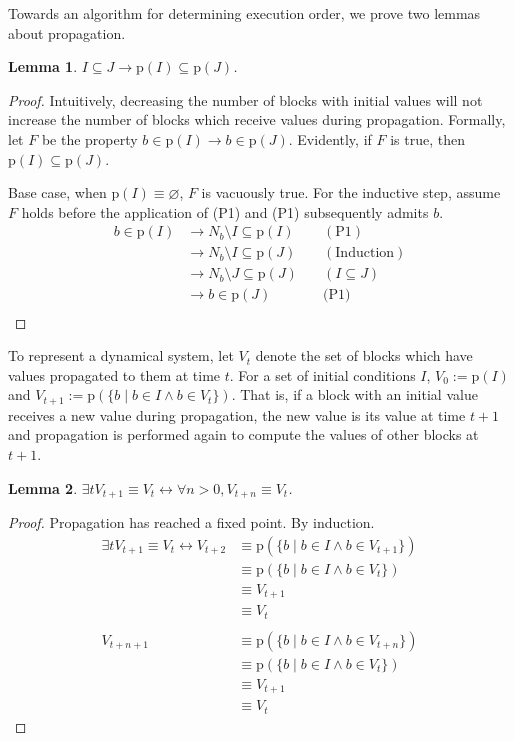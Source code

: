 \documentclass[twocolumn]{article}
\newtheorem{lemma}{Lemma}
\newcommand*{\Inputs}[1]{N_{#1}}
\begin{document}
Towards an algorithm for determining execution order, we prove two lemmas about propagation.

\begin{lemma}\label{lem:subset}
$I\subseteq J \rightarrow \text{p}(I)\subseteq\text{p}(J)$.
\end{lemma}
\begin{proof}
    Intuitively, decreasing the number of blocks with initial values will not increase the number of blocks which receive values during propagation. Formally, let $F$ be the property $b\in \text{p}(I)\rightarrow b\in\text{p}(J)$. Evidently, if $F$ is true, then $\text{p}(I)\subseteq\text{p}(J)$.

    Base case, when $\text{p}(I)\equiv\varnothing$, $F$ is vacuously true. For the inductive step, assume $F$ holds before the application of (P1) and (P1) subsequently admits $b$.
\begin{align*}
    b \in \text{p}(I) &\rightarrow \Inputs{b} \setminus I \subseteq \text{p}(I)\quad &(\text{P1})\\
    &\rightarrow \Inputs{b} \setminus I \subseteq \text{p}(J) \quad &(\text{Induction}) \\
    &\rightarrow \Inputs{b} \setminus J \subseteq \text{p}(J) \quad &(I \subseteq J) \\
    &\rightarrow b\in\text{p}(J)\quad &\text{(P1)} \\
\end{align*}
\end{proof}

To represent a dynamical system, let $V_t$ denote the set of blocks which have values propagated to them at time $t$. For a set of initial conditions $I$, $V_0 := \text{p}(I)$ and $V_{t+1} := \text{p}(\{b\mid b\in I \land b\in V_t\})$. That is, if a block with an initial value receives a new value during propagation, the new value is its value at time $t+1$ and propagation is performed again to compute the values of other blocks at $t+1$.

\begin{lemma}\label{lem:fixedpoint}
    $\exists t V_{t+1}\equiv V_t \leftrightarrow \forall n>0, V_{t+n}\equiv V_t$.
\end{lemma}
\begin{proof} Propagation has reached a fixed point. By induction.
    \[
       \begin{aligned}
           \exists t V_{t+1}\equiv V_t \leftrightarrow V_{t+2} &\equiv \text{p}(\{b\mid b\in I \land b\in V_{t+1}\}) \\
           &\equiv \text{p}(\{b\mid b\in I \land b\in V_{t}\}) \\
           &\equiv V_{t+1} \\
           &\equiv V_{t} \\ \\
           V_{t+n+1} &\equiv \text{p}(\{b\mid b\in I \land b\in V_{t+n}\}) \\
           &\equiv \text{p}(\{b\mid b\in I \land b\in V_{t}\}) \\
           &\equiv V_{t+1} \\
           &\equiv V_{t}
           \end{aligned}
    \]
\end{proof}
\end{document}
